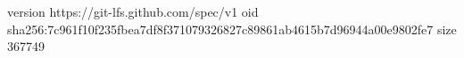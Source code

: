 version https://git-lfs.github.com/spec/v1
oid sha256:7c961f10f235fbea7df8f371079326827c89861ab4615b7d96944a00e9802fe7
size 367749
